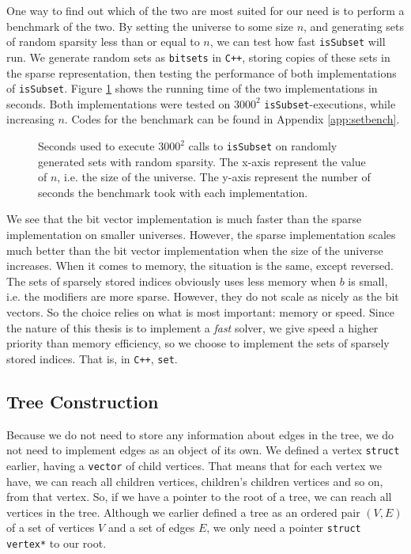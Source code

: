 One way to find out which of the two are most suited for our need is to perform
a benchmark of the two.
By setting the universe to some size $n$, and generating sets of
random sparsity less than or equal to $n$, we can test how fast
\texttt{isSubset} will run.
We generate random sets as \texttt{bitsets} in \texttt{C++}, storing copies
of these sets in the sparse representation, then testing the performance 
of both implementations of \texttt{isSubset}.
Figure \ref{fig:setspeed}
shows the running time of the two implementations in seconds. Both
implementations were tested on $3000^2$ \texttt{isSubset}-executions, while
increasing $n$.
Codes for the benchmark can be found in Appendix \ref{app:setbench}.
\begin{figure}[ht!]
\centering

\caption{Seconds used to execute $3000^2$ calls to \texttt{isSubset} on
         randomly generated sets with random sparsity. The x-axis represent 
         the value of $n$, i.e. the size of the universe. The y-axis
         represent the number of seconds the benchmark took with each
         implementation.}
\label{fig:setspeed}
\end{figure}

We see that the bit vector implementation is much faster than the sparse
implementation on smaller universes. However, the sparse implementation
scales much better than the bit vector implementation when the size of
the universe increases. When it comes to memory, the situation is the same,
except reversed. The sets of sparsely stored indices obviously uses less
memory when $b$ is small, i.e. the modifiers are more sparse. However, they
do not scale as nicely as the bit vectors. So the choice relies on what is
most important: memory or speed. Since the nature of this thesis is to
implement a \emph{fast} solver, we give speed a higher priority than memory 
efficiency, so we choose to implement the sets of sparsely stored
indices. That is, in \texttt{C++}, \texttt{set}.

\subsection{Tree Construction}
Because we do not need to store any information about edges in the tree,
we do not need to implement edges as an object of its own. We defined
a vertex \texttt{struct} earlier, having a \texttt{vector} of child
vertices. That means that for each vertex we have, we can reach all children
vertices, children's children vertices and so on, from that vertex.
So, if we have a pointer to the root of a tree, we can reach all vertices
in the tree. Although we earlier defined a tree as an ordered pair
$(V, E)$ of a set of vertices $V$ and a set of edges $E$, we only need a
pointer \texttt{struct vertex*} to our root.

